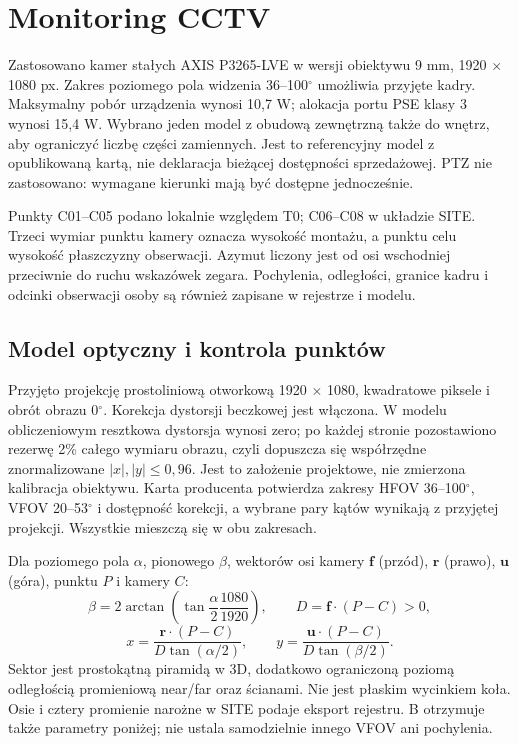 \section{Monitoring CCTV}
Zastosowano \CameraCount{} kamer stałych AXIS P3265-LVE w wersji obiektywu 9 mm, 1920 $\times$ 1080 px. Zakres poziomego pola widzenia 36--100$^\circ$ umożliwia przyjęte kadry. Maksymalny pobór urządzenia wynosi 10,7 W; alokacja portu PSE klasy 3 wynosi 15,4 W. Wybrano jeden model z obudową zewnętrzną także do wnętrz, aby ograniczyć liczbę części zamiennych. Jest to referencyjny model z opublikowaną kartą, nie deklaracja bieżącej dostępności sprzedażowej. PTZ nie zastosowano: wymagane kierunki mają być dostępne jednocześnie.\cite{S-CAM}

\CameraTable

Punkty C01--C05 podano lokalnie względem T0; C06--C08 w układzie SITE. Trzeci wymiar punktu kamery oznacza wysokość montażu, a punktu celu wysokość płaszczyzny obserwacji. Azymut liczony jest od osi wschodniej przeciwnie do ruchu wskazówek zegara. Pochylenia, odległości, granice kadru i odcinki obserwacji osoby są również zapisane w rejestrze i modelu.

\subsection*{Model optyczny i kontrola punktów}
Przyjęto projekcję prostoliniową otworkową 1920 $\times$ 1080, kwadratowe piksele i obrót obrazu 0$^\circ$. Korekcja dystorsji beczkowej jest włączona. W modelu obliczeniowym resztkowa dystorsja wynosi zero; po każdej stronie pozostawiono rezerwę 2\% całego wymiaru obrazu, czyli dopuszcza się współrzędne znormalizowane $|x|,|y|\leq0{,}96$. Jest to założenie projektowe, nie zmierzona kalibracja obiektywu. Karta producenta potwierdza zakresy HFOV 36--100$^\circ$, VFOV 20--53$^\circ$ i dostępność korekcji, a wybrane pary kątów wynikają z przyjętej projekcji. Wszystkie mieszczą się w obu zakresach.\cite{S-CAM}

Dla poziomego pola $\alpha$, pionowego $\beta$, wektorów osi kamery $\mathbf f$ (przód), $\mathbf r$ (prawo), $\mathbf u$ (góra), punktu $P$ i kamery $C$:
\[
\beta=2\arctan\left(\tan\frac{\alpha}{2}\frac{1080}{1920}\right),\qquad
D=\mathbf f\cdot(P-C)>0,
\]
\[
x=\frac{\mathbf r\cdot(P-C)}{D\tan(\alpha/2)},\qquad
y=\frac{\mathbf u\cdot(P-C)}{D\tan(\beta/2)}.
\]
Sektor jest prostokątną piramidą w 3D, dodatkowo ograniczoną poziomą odległością promieniową near/far oraz ścianami. Nie jest płaskim wycinkiem koła. Osie i cztery promienie narożne w SITE podaje eksport rejestru. B otrzymuje także parametry poniżej; nie ustala samodzielnie innego VFOV ani pochylenia.

